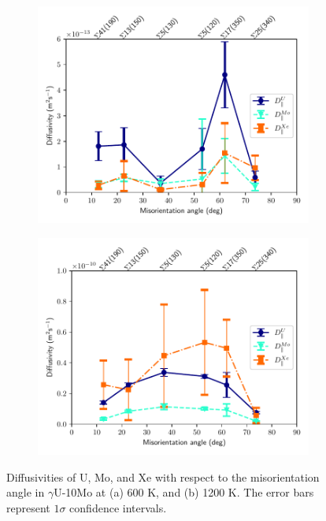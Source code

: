 \documentclass{elsarticle}
\providecommand{\DIFadd}[1]{{\protect\color{blue} \sf #1}} %
\providecommand{\DIFaddFL}[1]{\DIFadd{#1}} %
\providecommand{\DIFaddbeginFL}{} %
\providecommand{\DIFaddendFL}{} %
\begin{document}
\begin{figure}[!ht]
    \centering
    \begin{subfigure}{0.49\textwidth}
        \centering
        \caption{}
        \includegraphics[width=\textwidth]{DvsTilt_600K.pdf}
    \end{subfigure}
    \begin{subfigure}{0.49\textwidth}
        \centering
        \caption{}
        \includegraphics[width=\textwidth]{DvsTilt_1200K.pdf}
    \end{subfigure}
\caption{Diffusivities of U, Mo, and Xe with respect to the misorientation angle in $\gamma$U-10Mo at (a) 600 K, and (b) 1200 K. \DIFaddbeginFL \DIFaddFL{The error bars represent $1\sigma$ confidence intervals.}\DIFaddendFL }
\label{fig:dvstilt}
\end{figure}
\end{document}
